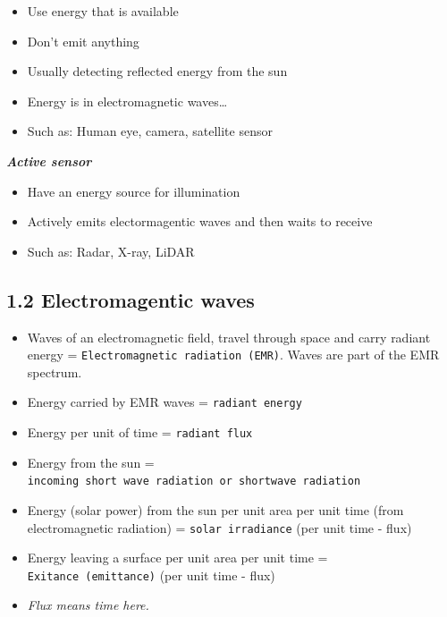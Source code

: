 \documentclass[
  letterpaper,
  DIV=11,
  numbers=noendperiod]{scrreprt}
\providecommand{\tightlist}{%
  \setlength{\itemsep}{0pt}\setlength{\parskip}{0pt}}\usepackage{longtable,booktabs,array}
\begin{document}
\begin{itemize}
\tightlist
\item
  Use energy that is available
\item
  Don't emit anything
\item
  Usually detecting reflected energy from the sun
\item
  Energy is in electromagnetic waves\ldots{}
\item
  Such as: Human eye, camera, satellite sensor
\end{itemize}

\textbf{\emph{Active sensor}}

\begin{itemize}
\tightlist
\item
  Have an energy source for illumination
\item
  Actively emits electormagentic waves and then waits to receive
\item
  Such as: Radar, X-ray, LiDAR
\end{itemize}

\hypertarget{electromagentic-waves}{%
\subsection*{\texorpdfstring{\textbf{1.2 Electromagentic
waves}}{1.2 Electromagentic waves}}\label{electromagentic-waves}}

\begin{tcolorbox}[enhanced jigsaw, titlerule=0mm, breakable, bottomtitle=1mm, left=2mm, title=\textcolor{quarto-callout-tip-color}{\faLightbulb}\hspace{0.5em}{Terms}, arc=.35mm, coltitle=black, colframe=quarto-callout-tip-color-frame, opacityback=0, bottomrule=.15mm, colback=white, colbacktitle=quarto-callout-tip-color!10!white, rightrule=.15mm, leftrule=.75mm, toptitle=1mm, toprule=.15mm, opacitybacktitle=0.6]

\begin{itemize}
\tightlist
\item
  Waves of an electromagnetic field, travel through space and carry
  radiant energy = \texttt{Electromagnetic\ radiation\ (EMR)}. Waves are
  part of the EMR spectrum.
\item
  Energy carried by EMR waves = \texttt{radiant\ energy}
\item
  Energy per unit of time = \texttt{radiant\ flux}
\item
  Energy from the sun =
  \texttt{incoming\ short\ wave\ radiation\ or\ shortwave\ radiation}
\item
  Energy (solar power) from the sun per unit area per unit time (from
  electromagnetic radiation) = \texttt{solar\ irradiance} (per unit time
  - flux)
\item
  Energy leaving a surface per unit area per unit time =
  \texttt{Exitance\ (emittance)} (per unit time - flux)
\item
  \emph{Flux means time here.}
\end{itemize}

\end{tcolorbox}
\end{document}
